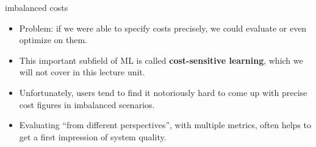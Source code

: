 \documentclass[11pt,compress,t,notes=noshow, xcolor=table]{beamer}
\begin{document}
\begin{vbframe}{imbalanced costs}
\lz

\begin{itemize}
  \item Problem: if we were able to specify costs precisely, we could evaluate 
  or even optimize on them.
  \item This important subfield of ML is called \textbf{cost-sensitive 
  learning}, which we will not cover in this lecture unit.
  \item Unfortunately, users tend to find it notoriously hard to come up with 
  precise cost figures in imbalanced scenarios.
  \item Evaluating \enquote{from different perspectives}, with multiple metrics, 
  often helps to get a first impression of system quality.
\end{itemize}
 
\end{vbframe}
 
 

\end{document}
